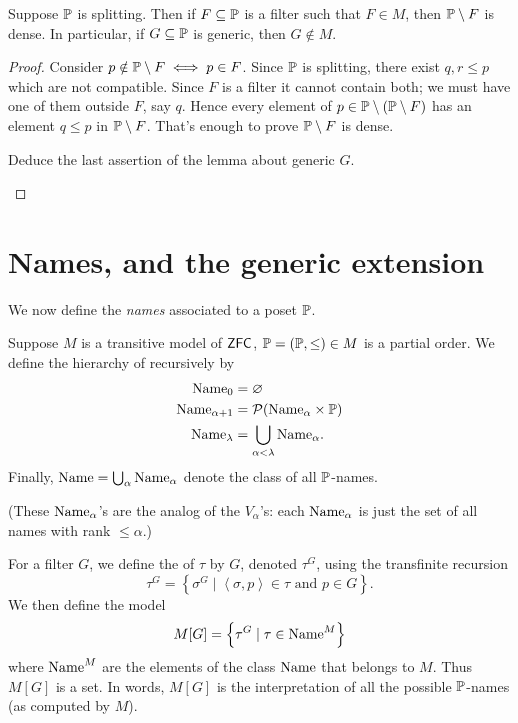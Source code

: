 \begin{lemma}
	\label{lemma:splitting_poset_omit_generic}
	Suppose $\mathbb P$ is splitting.  Then if $F \subseteq \mathbb P$ is a filter
	such that $F \in M$, then $\mathbb P \setminus F$ is dense.
	In particular, if $G \subseteq \mathbb P$ is generic, then $G \notin M$.
\end{lemma}
\begin{proof}
	Consider $p \notin \mathbb P \setminus F \iff p \in F$.
	Since $\mathbb P$ is splitting, there exist $q, r \le p$ which are not compatible.
	Since $F$ is a filter it cannot contain both;
	we must have one of them outside $F$, say $q$.
	Hence every element of $p \in \mathbb P \setminus (\mathbb P \setminus F)$
	has an element $q \le p$ in $\mathbb P \setminus F$.
	That's enough to prove $\mathbb P \setminus F$ is dense.
	\begin{ques}
		Deduce the last assertion of the lemma about generic $G$. \qedhere
	\end{ques}
\end{proof}

\section{Names, and the generic extension}
We now define the \emph{names} associated to a poset $\mathbb P$.

\begin{definition}
	Suppose $M$ is a transitive model of $\mathsf{ZFC}$, $\mathbb P = (\mathbb P, \le) \in M$ is a partial order.
	We define the hierarchy of  recursively by
	\begin{align*}
		\text{Name}_0 &= \varnothing \\
		\text{Name}_{\alpha+1} &= \mathcal P(\text{Name}_\alpha \times \mathbb P) \\
		\text{Name}_{\lambda} &= \bigcup_{\alpha < \lambda} \text{Name}_\alpha.
	\end{align*}
	Finally, $\text{Name} = \bigcup_\alpha \text{Name}_\alpha$ denote the class of all $\mathbb P$-names.
\end{definition}
(These $\text{Name}_\alpha$'s are the analog of the $V_\alpha$'s:
each $\text{Name}_\alpha$ is just the set of all names with rank $\le \alpha$.)

\begin{definition}
	For a filter $G$, we define the  of $\tau$ by $G$,
	denoted $\tau^G$, using the transfinite recursion
	\[ \tau^G
		= \left\{ \sigma^G
		\mid \left<\sigma, p\right> \in \tau
		\text{ and } p \in G\right\}. \]
	We then define the model
	\[ M[G] = \left\{ \tau^G \mid \tau \in \text{Name}^M \right\} \]
	where $\text{Name}^M$ are the elements of the class $\text{Name}$ that belongs to $M$. Thus $M[G]$ is a set.
	In words, $M[G]$ is the interpretation of all the possible $\mathbb P$-names
	(as computed by $M$).
\end{definition}

